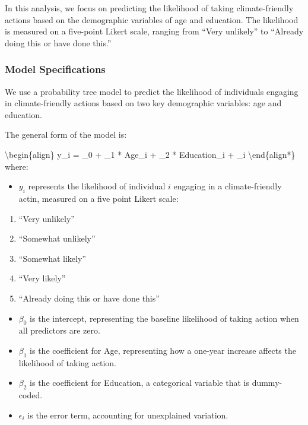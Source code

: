 \documentclass[
  letterpaper,
  DIV=11,
  numbers=noendperiod]{scrartcl}
\providecommand{\tightlist}{%
  \setlength{\itemsep}{0pt}\setlength{\parskip}{0pt}}\usepackage{longtable,booktabs,array}
\begin{document}
In this analysis, we focus on predicting the likelihood of taking
climate-friendly actions based on the demographic variables of age and
education. The likelihood is measured on a five-point Likert scale,
ranging from ``Very unlikely'' to ``Already doing this or have done
this.''

\subsubsection{Model Specifications}\label{model-specifications}

We use a probability tree model to predict the likelihood of individuals
engaging in climate-friendly actions based on two key demographic
variables: age and education.

The general form of the model is:

\textbackslash begin\{align\} y\_i = \beta\_0 + \beta\_1 * Age\_i +
\beta\_2 * Education\_i + \epsilon\_i \textbackslash end\{align*\}
where:

\begin{itemize}
\tightlist
\item
  \(y_i\) represents the likelihood of individual \(i\) engaging in a
  climate-friendly actin, measured on a five point Likert scale:
\end{itemize}

\begin{enumerate}
\def\labelenumi{\arabic{enumi}.}
\tightlist
\item
  ``Very unlikely''
\item
  ``Somewhat unlikely''
\item
  ``Somewhat likely''
\item
  ``Very likely''
\item
  ``Already doing this or have done this''
\end{enumerate}

\begin{itemize}
\tightlist
\item
  \(\beta_0\) is the intercept, representing the baseline likelihood of
  taking action when all predictors are zero.
\item
  \(\beta_1\) is the coefficient for Age, representing how a one-year
  increase affects the likelihood of taking action.
\item
  \(\beta_2\) is the coefficient for Education, a categorical variable
  that is dummy-coded.
\item
  \(\epsilon_i\) is the error term, accounting for unexplained
  variation.
\end{itemize}
\end{document}
